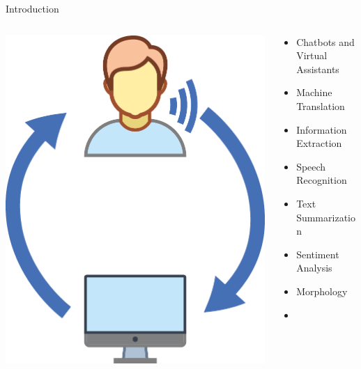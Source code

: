 \documentclass{beamer}
\begin{document}
\begin{frame}{Introduction}
    \begin{columns}
        \begin{column}{0.5\textwidth}
            \includegraphics[width=\linewidth,keepaspectratio]{images/human_computer_interaction}
            \label{fig:human_computer_interaction}
        \end{column}
        \begin{column}{0.5\textwidth}
            \begin{itemize}
                \item Chatbots and Virtual Assistants
                \item Machine Translation
                \item Information Extraction
                \item Speech Recognition
                \item Text Summarization
                \item Sentiment Analysis
                \item Morphology
                \item {}
            \end{itemize}
        \end{column}
    \end{columns}
\end{frame}
\end{document}
